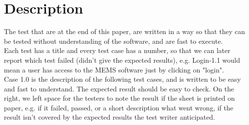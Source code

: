 \documentclass{scrreprt}
\begin{document}
\section{Description}
The test that are at the end of this paper, are written in a way so that they can be tested without understanding of the software, and are fast to execute. \\
Each test has a title and every test case has a number, so that we can later report which test failed (didn't give the expected results), e.g. Login-1.1 would mean a user has access to the MEMS software just by clicking on "login".
\\
Case 1.0 is the description of the following test cases, and is written to be easy and fast to understand. The expected result should be easy to check. On the right, we left space for the testers to note the result if the sheet is printed on paper, e.g. if it failed, passed, or a short description what went wrong, if the result isn't covered by the expected results the test writer anticipated.\\



\end{document}
